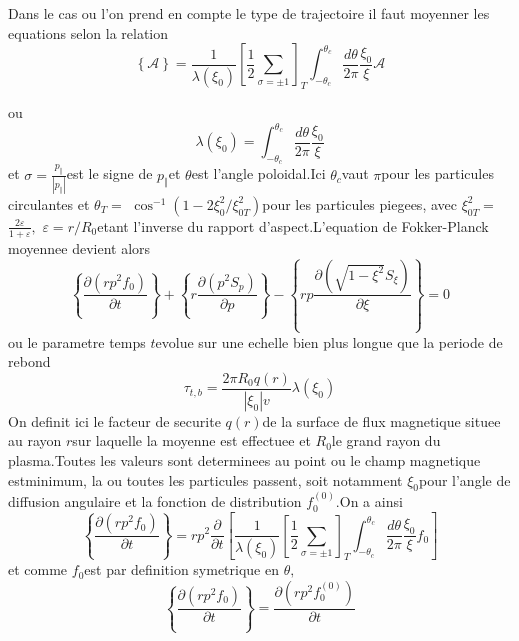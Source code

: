 Dans le cas ou l'on prend en compte le type de trajectoire il faut
moyenner les equations selon la relation \[
\left\{ \mathcal{A}\right\} =\frac{1}{\lambda\left(\xi_{0}\right)}\left[\frac{1}{2}\sum_{\sigma=\pm1}\right]_{T}\int_{-\theta_{c}}^{\theta_{c}}\frac{d\theta}{2\pi}\frac{\xi_{0}}{\xi}\mathcal{A}\]


ou \[
\lambda\left(\xi_{0}\right)=\int_{-\theta_{c}}^{\theta_{c}}\frac{d\theta}{2\pi}\frac{\xi_{0}}{\xi}\]
 et $\sigma=\frac{p_{\Vert}}{\left|p_{\Vert}\right|}$est le signe
de $p_{\Vert}$et $\theta$est l'angle poloidal.Ici $\theta_{c}$vaut
$\pi$pour les particules circulantes et $\theta_{T}=$ $\cos^{-1}\left(1-2\xi_{0}^{2}/\xi_{0T}^{2}\right)$pour
les particules piegees, avec $\xi_{0T}^{2}=$ $\frac{2\varepsilon}{1+\varepsilon},$
$\varepsilon=r/R_{0}$etant l'inverse du rapport d'aspect.L'equation
de Fokker-Planck moyennee devient alors\[
\left\{ \frac{\partial\left(rp^{2}f_{0}\right)}{\partial t}\right\} +\left\{ r\frac{\partial\left(p^{2}S_{p}\right)}{\partial p}\right\} -\left\{ rp\frac{\partial\left(\sqrt{1-\xi^{2}}S_{\xi}\right)}{\partial\xi}\right\} =0\]
 ou le parametre temps $t$evolue sur une echelle bien plus longue
que la periode de rebond \[
\tau_{t,b}=\frac{2\pi R_{0}q\left(r\right)}{\left|\xi_{0}\right|v}\lambda\left(\xi_{0}\right)\]
 On definit ici le facteur de securite $q\left(r\right)$de la surface
de flux magnetique situee au rayon $r$sur laquelle la moyenne est
effectuee et $R_{0}$le grand rayon du plasma.Toutes les valeurs sont
determinees au point ou le champ magnetique estminimum, la ou toutes
les particules passent, soit notamment $\xi_{0}$pour l'angle de diffusion
angulaire et la fonction de distribution $f_{0}^{\left(0\right)}$.On
a ainsi \[
\left\{ \frac{\partial\left(rp^{2}f_{0}\right)}{\partial t}\right\} =rp^{2}\frac{\partial}{\partial t}\left[\frac{1}{\lambda\left(\xi_{0}\right)}\left[\frac{1}{2}\sum_{\sigma=\pm1}\right]_{T}\int_{-\theta_{c}}^{\theta_{c}}\frac{d\theta}{2\pi}\frac{\xi_{0}}{\xi}f_{0}\right]\]
 et comme $f_{0}$est par definition symetrique en $\theta,$\[
\left\{ \frac{\partial\left(rp^{2}f_{0}\right)}{\partial t}\right\} =\frac{\partial\left(rp^{2}f_{0}^{(0)}\right)}{\partial t}\]


